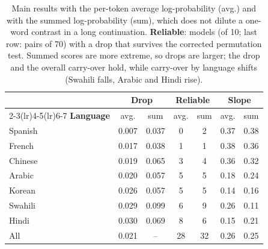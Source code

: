 \begin{table}[t]
\centering
\small
\setlength{\tabcolsep}{3pt}
\begin{tabular}{lcccccc}
\toprule
 & \multicolumn{2}{c}{\textbf{Drop}} & \multicolumn{2}{c}{\textbf{Reliable}} & \multicolumn{2}{c}{\textbf{Slope}} \\
\cmidrule(lr){2-3}\cmidrule(lr){4-5}\cmidrule(lr){6-7}
\textbf{Language} & avg. & sum & avg. & sum & avg. & sum \\
\midrule
Spanish & 0.007 & 0.037 & 0 & 2 & 0.37 & 0.38 \\
French & 0.017 & 0.038 & 1 & 1 & 0.38 & 0.36 \\
Chinese & 0.019 & 0.065 & 3 & 4 & 0.36 & 0.32 \\
Arabic & 0.020 & 0.057 & 5 & 5 & 0.18 & 0.24 \\
Korean & 0.026 & 0.057 & 5 & 5 & 0.14 & 0.16 \\
Swahili & 0.029 & 0.099 & 6 & 9 & 0.26 & 0.11 \\
Hindi & 0.030 & 0.069 & 8 & 6 & 0.15 & 0.21 \\
\midrule
All & 0.021 & -- & 28 & 32 & 0.26 & 0.25 \\
\bottomrule
\end{tabular}
\caption{Main results with the per-token average log-probability (avg.) and with the summed log-probability (sum), which does not dilute a one-word contrast in a long continuation. \textbf{Reliable}: models (of 10; last row: pairs of 70) with a drop that survives the corrected permutation test. Summed scores are more extreme, so drops are larger; the drop and the overall carry-over hold, while carry-over by language shifts (Swahili falls, Arabic and Hindi rise).}
\label{tab:summed}
\end{table}
